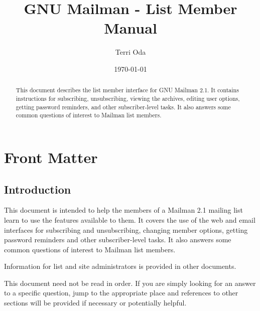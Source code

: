 \documentclass{howto}
\title{GNU Mailman - List Member Manual}
\author{Terri Oda}
\date{\today}        %
\begin{document}
\maketitle

%
\ifhtml
\chapter*{Front Matter\label{front}}
\fi


\begin{abstract}
\noindent
This document describes the list member interface for GNU
Mailman 2.1.  It contains instructions for subscribing, unsubscribing, 
viewing the archives, editing user options, getting password reminders,
and other subscriber-level tasks.  It also answers some common questions
of interest to Mailman list members.
\end{abstract}

\tableofcontents

\section{Introduction}

This document is intended to help the members of a Mailman 2.1 mailing list
learn to use the features available to them.  It covers the use of the
web and email interfaces for subscribing and unsubscribing, changing 
member options, getting password reminders and other subscriber-level
tasks.  It also answers some common questions of interest to Mailman list
members.

Information for list and site administrators is provided in
other documents.

This document need not be read in order.  If you are simply looking for
an answer to a specific question, jump to the appropriate place and 
references to other sections will be provided if necessary or potentially 
helpful.

\end{document}
